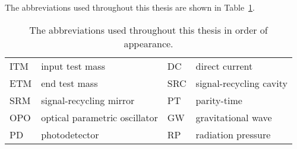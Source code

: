 The abbreviations used throughout this thesis are shown in Table~\ref{tab:abbreviations}.

\begin{table}[h]
\centering
\begin{tabular}{@{}ll|ll@{}}
\toprule
ITM & input test mass & DC & direct current \\
ETM & end test mass & SRC & signal-recycling cavity \\
SRM & signal-recycling mirror & PT & parity-time \\
OPO & optical parametric oscillator & GW & gravitational wave \\
PD & photodetector & RP & radiation pressure \\ \bottomrule
\end{tabular}
\caption{The abbreviations used throughout this thesis in order of appearance.}
\label{tab:abbreviations}
\end{table}




